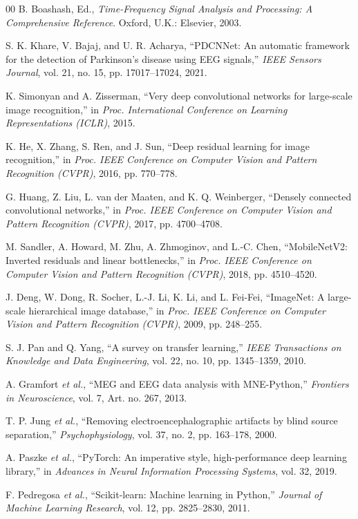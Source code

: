 \documentclass[conference]{IEEEtran}
\begin{document}
\begin{thebibliography}{00}
B. Boashash, Ed., \textit{Time-Frequency Signal Analysis and
Processing: A Comprehensive Reference}. Oxford, U.K.: Elsevier, 2003.

S. K. Khare, V. Bajaj, and U. R. Acharya, ``PDCNNet: An automatic
framework for the detection of Parkinson's disease using EEG
signals,'' \textit{IEEE Sensors Journal}, vol. 21, no. 15,
pp. 17017--17024, 2021.

K. Simonyan and A. Zisserman, ``Very deep convolutional networks for
large-scale image recognition,'' in \textit{Proc. International
Conference on Learning Representations (ICLR)}, 2015.

K. He, X. Zhang, S. Ren, and J. Sun, ``Deep residual learning for
image recognition,'' in \textit{Proc. IEEE Conference on Computer
Vision and Pattern Recognition (CVPR)}, 2016, pp. 770--778.

G. Huang, Z. Liu, L. van der Maaten, and K. Q. Weinberger,
``Densely connected convolutional networks,'' in \textit{Proc. IEEE
Conference on Computer Vision and Pattern Recognition (CVPR)}, 2017,
pp. 4700--4708.

M. Sandler, A. Howard, M. Zhu, A. Zhmoginov, and L.-C. Chen,
``MobileNetV2: Inverted residuals and linear bottlenecks,'' in
\textit{Proc. IEEE Conference on Computer Vision and Pattern
Recognition (CVPR)}, 2018, pp. 4510--4520.

J. Deng, W. Dong, R. Socher, L.-J. Li, K. Li, and L. Fei-Fei,
``ImageNet: A large-scale hierarchical image database,'' in
\textit{Proc. IEEE Conference on Computer Vision and Pattern
Recognition (CVPR)}, 2009, pp. 248--255.

S. J. Pan and Q. Yang, ``A survey on transfer learning,''
\textit{IEEE Transactions on Knowledge and Data Engineering},
vol. 22, no. 10, pp. 1345--1359, 2010.

A. Gramfort \emph{et al.}, ``MEG and EEG data analysis with
MNE-Python,'' \textit{Frontiers in Neuroscience}, vol. 7,
Art. no. 267, 2013.

T. P. Jung \emph{et al.}, ``Removing electroencephalographic
artifacts by blind source separation,'' \textit{Psychophysiology},
vol. 37, no. 2, pp. 163--178, 2000.

A. Paszke \emph{et al.}, ``PyTorch: An imperative style,
high-performance deep learning library,'' in \textit{Advances in
Neural Information Processing Systems}, vol. 32, 2019.

F. Pedregosa \emph{et al.}, ``Scikit-learn: Machine learning in
Python,'' \textit{Journal of Machine Learning Research}, vol. 12,
pp. 2825--2830, 2011.

\end{thebibliography}
\end{document}
